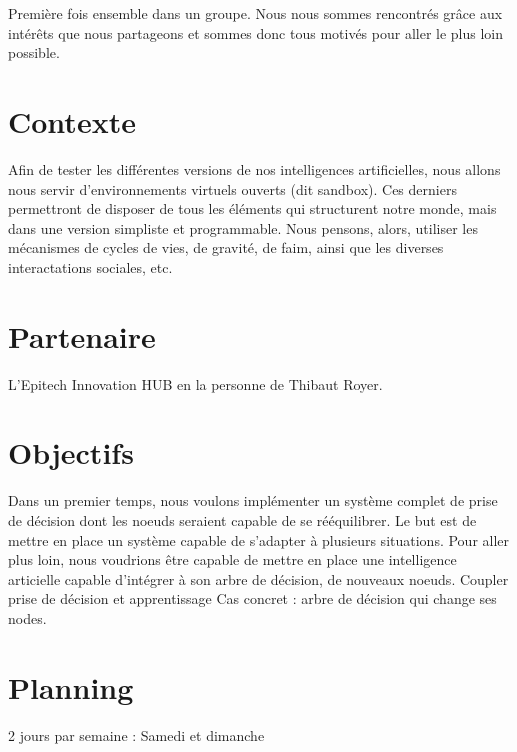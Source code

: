 \documentclass[a4paper]{report}
\begin{document}
  \noindent
  Première fois ensemble dans un groupe. Nous nous sommes rencontrés grâce aux
  intérêts que nous partageons et sommes donc tous motivés pour aller le plus
  loin possible.

  \section*{Contexte}
  Afin de tester les différentes versions de nos intelligences artificielles, nous allons nous servir d'environnements virtuels ouverts (dit sandbox).
  Ces derniers permettront de disposer de tous les éléments qui structurent notre monde, mais dans une version simpliste et programmable.
  Nous pensons, alors, utiliser les mécanismes de cycles de vies, de gravité, de faim, ainsi que les diverses interactations sociales, etc.

  \section*{Partenaire}

  L'Epitech Innovation HUB en la personne de Thibaut Royer.

  \section*{Objectifs}
  Dans un premier temps, nous voulons implémenter un système complet de prise de décision dont les noeuds seraient capable de se rééquilibrer. Le but est
  de mettre en place un système capable de s'adapter à plusieurs situations. Pour aller plus loin, nous voudrions être capable de mettre en place
  une intelligence articielle capable d'intégrer à son arbre de décision, de nouveaux noeuds.
  Coupler prise de décision et apprentissage
  Cas concret : arbre de décision qui change ses nodes.

  \section*{Planning}
  2 jours par semaine : Samedi et dimanche
\end{document}
